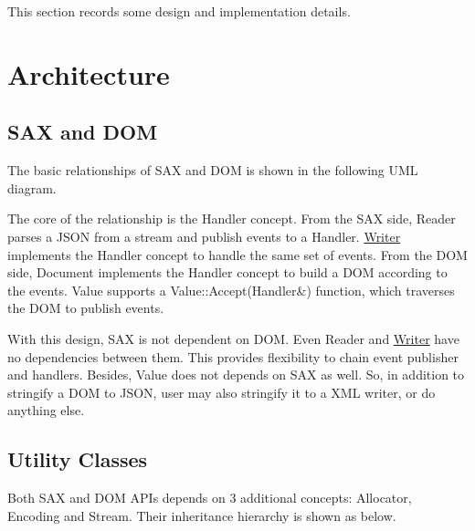 This section records some design and implementation details.\hypertarget{md_Commun_Externe_RapidJSON_doc_internals_Architecture}{}\section{Architecture}\label{md_Commun_Externe_RapidJSON_doc_internals_Architecture}
\subsection*{S\+AX and D\+OM}

The basic relationships of S\+AX and D\+OM is shown in the following U\+ML diagram.



The core of the relationship is the {\ttfamily Handler} concept. From the S\+AX side, {\ttfamily Reader} parses a J\+S\+ON from a stream and publish events to a {\ttfamily Handler}. {\ttfamily \hyperlink{class_writer}{Writer}} implements the {\ttfamily Handler} concept to handle the same set of events. From the D\+OM side, {\ttfamily Document} implements the {\ttfamily Handler} concept to build a D\+OM according to the events. {\ttfamily Value} supports a {\ttfamily Value\+::\+Accept(\+Handler\&)} function, which traverses the D\+OM to publish events.

With this design, S\+AX is not dependent on D\+OM. Even {\ttfamily Reader} and {\ttfamily \hyperlink{class_writer}{Writer}} have no dependencies between them. This provides flexibility to chain event publisher and handlers. Besides, {\ttfamily Value} does not depends on S\+AX as well. So, in addition to stringify a D\+OM to J\+S\+ON, user may also stringify it to a X\+ML writer, or do anything else.

\subsection*{Utility Classes}

Both S\+AX and D\+OM A\+P\+Is depends on 3 additional concepts\+: {\ttfamily Allocator}, {\ttfamily Encoding} and {\ttfamily Stream}. Their inheritance hierarchy is shown as below.

